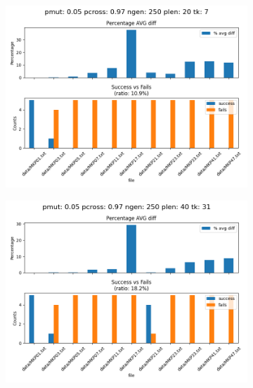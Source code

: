 \begin{figure}[H]
    \begin{subfigure}{.3\textwidth}
        \includegraphics[width=\textwidth]{img/tuning/tuning_results_5_97_250_20_7.png}
    \end{subfigure}
    \begin{subfigure}{.3\textwidth}
        \includegraphics[width=\textwidth]{img/tuning/tuning_results_5_97_250_40_31.png}
    \end{subfigure}
    \begin{subfigure}{.3\textwidth}

\end{subfigure}
\end{figure}
